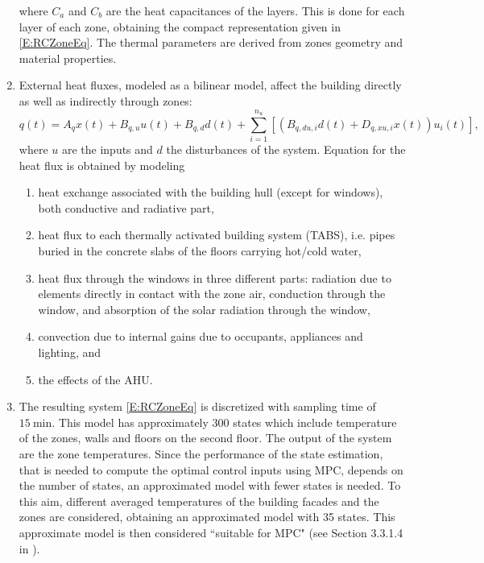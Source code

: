 \begin{enumerate}
		where $C_a$ and $C_b$ are the heat capacitances of the layers. This is done for each layer of each zone, obtaining the compact representation given in \eqref{E:RCZoneEq}. The thermal parameters are derived from zones geometry and material properties.
	\item External heat fluxes, modeled as a bilinear model, affect the building directly as well as indirectly through zones:
		\begin{equation}\label{E:RCfluxes}
			q(t) = A_q x(t) + B_{q,u}u(t) + B_{q,d}d(t) + \sum_{i=1}^{n_u}{[\left(B_{q,du,i}d(t) + D_{q,xu,i}x(t)\right)u_i(t)]},
		\end{equation}
		where $u$ are the inputs and $d$ the disturbances of the system.
Equation \label{E:RCfluxes} for the heat flux is obtained by modeling
	\begin{enumerate}
		\item heat exchange associated with the building hull (except for windows), both conductive and radiative part,
		\item  heat flux to each thermally activated building system (TABS), i.e. pipes buried in the concrete slabs of the floors carrying hot/cold water,
		\item heat flux through the windows in three different parts: radiation due to elements directly in contact with the zone air, conduction through the window, and absorption of the solar radiation through the window,
		\item convection due to internal gains due to occupants, appliances and lighting, and
		\item the effects of the AHU.
	\end{enumerate}
	\item The resulting system \eqref{E:RCZoneEq} is discretized with sampling time of $15\ \mathrm{min}$. This model has approximately 300 states which include temperature of the zones, walls and floors on the second floor. The output of the system are the zone temperatures.
	Since the performance of the state estimation, that is needed to compute the optimal control inputs using MPC, depends on the number of states, an approximated model with fewer states is needed.
	To this aim, different averaged temperatures of the building facades and the zones are considered, obtaining an approximated model with 35 states. This  approximate model is then considered ``suitable for MPC" (see Section 3.3.1.4 in \cite{SturzeneggerTR}). 
\end{enumerate}
	
